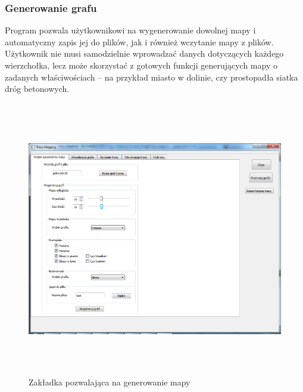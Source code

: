 \documentclass[12pt,a4paper]{article}
\begin{document}
\subsubsection{Generowanie grafu}
Program pozwala użytkownikowi na wygenerowanie dowolnej mapy i automatyczny zapis jej do plików, jak i również wczytanie mapy z plików. Użytkownik nie musi samodzielnie wprowadzać danych dotyczących każdego wierzchołka, lecz może skorzystać z gotowych funkcji generujących mapy o zadanych właściwościach -- na przykład miasto w dolinie, czy prostopadła siatka dróg betonowych.

\begin{figure}[!h]
	\centering
	\includegraphics[height=120mm]{./ilustracje/screen1.png}
	\caption{Zakładka pozwalająca na generowanie mapy}
\end{figure}
\end{document}
